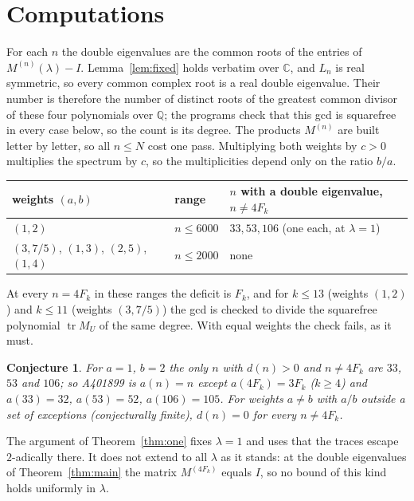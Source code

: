 \documentclass[11pt]{amsart}
\newtheorem{conjecture}[theorem]{Conjecture}
\theoremstyle{definition}
\newcommand{\tr}{\operatorname{tr}}
\newcommand{\Q}{\mathbb{Q}}
\begin{document}
\section{Computations}\label{sec:comp}

For each $n$ the double eigenvalues are the common roots of the entries of $M^{(n)}(\lambda)-I$. Lemma~\ref{lem:fixed}
holds verbatim over $\mathbb{C}$, and $L_n$ is real symmetric, so every common complex root is a real double
eigenvalue. Their number is therefore the number of distinct roots of the greatest common divisor of these four
polynomials over $\Q$; the programs check that this gcd is squarefree in every case below, so the count is its
degree. The products $M^{(n)}$ are built letter by letter, so all $n\le N$ cost one
pass. Multiplying both weights by $c>0$ multiplies the spectrum by $c$, so the
multiplicities depend only on the ratio $b/a$.

\begin{center}
\begin{tabular}{@{}lll@{}}
\toprule
weights $(a,b)$ & range & $n$ with a double eigenvalue, $n\ne4F_k$\\
\midrule
$(1,2)$ & $n\le6000$ & $33,53,106$ (one each, at $\lambda=1$)\\
$(3,7/5)$, $(1,3)$, $(2,5)$, $(1,4)$ & $n\le2000$ & none\\
\bottomrule
\end{tabular}
\end{center}

\noindent At every $n=4F_k$ in these ranges the deficit is $F_k$, and for $k\le13$ (weights $(1,2)$) and
$k\le11$ (weights $(3,7/5)$) the gcd is checked to divide the squarefree polynomial $\tr M_U$ of the same
degree. With equal weights the check fails, as it must.

\begin{conjecture}\label{conj}
For $a=1$, $b=2$ the only $n$ with $d(n)>0$ and $n\ne4F_k$ are $33$, $53$ and $106$; so A401899 is
$a(n)=n$ except $a(4F_k)=3F_k$ ($k\ge4$) and $a(33)=32$, $a(53)=52$, $a(106)=105$. For weights $a\ne b$ with
$a/b$ outside a set of exceptions (conjecturally finite), $d(n)=0$ for every $n\ne4F_k$.
\end{conjecture}

The argument of Theorem~\ref{thm:one} fixes $\lambda=1$ and uses that the traces escape $2$-adically there. It
does not extend to all $\lambda$ as it stands: at the double eigenvalues of Theorem~\ref{thm:main} the matrix
$M^{(4F_k)}$ equals $I$, so no bound of this kind holds uniformly in $\lambda$.
\end{document}
